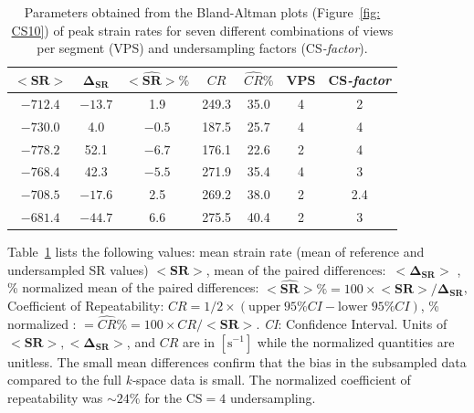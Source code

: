 \begin{table}[!htb]
\vspace{+0.2cm}
\caption[Parameters obtained from the Bland-Altman plots of peak strain rates for seven different combinations of views per segment and undersampling factors]{Parameters obtained from the Bland-Altman plots (Figure~\ref{fig: CS10}) of peak strain rates for seven different combinations of views per segment (VPS) and undersampling factors (\mbox{CS\textit{-factor}}).}
\label{tab: CS2}
\begin{center}
\begin{tabular}{@{}ccccccc@{}}
\toprule[1pt]\midrule[0.3pt]
$\mathbf{<SR>}$     & $\mathbf{\Delta_{SR}}$ & $\mathbf{<\hat{SR}> \%}$ & ${CR}$    & ${\hat{CR}} \%$ & VPS & \mbox{CS\textit{-factor}} \\ \midrule
$-712.4$ & $-13.7$    	& 1.9   	& 249.3 & 35.0   	& 4   & 2                  \\
$-730.0$ & 4.0        	& $-0.5$  	& 187.5 & 25.7  		& 4   & 4                  \\
$-778.2$ & 52.1     	& $-6.7$  	& 176.1 & 22.6  		& 2   & 4                  \\
$-768.4$ & 42.3     	& $-5.5$  	& 271.9 & 35.4  		& 4   & 3                  \\
$-708.5$ & $-17.6$    	& 2.5   	& 269.2 & 38.0    	& 2   & 2.4                \\
$-681.4$ & $-44.7$    	& 6.6   	& 275.5 & 40.4  		& 2   & 3         \\ \midrule[0.3pt]\bottomrule[1pt]
\end{tabular}
\end{center}
\vspace{-0.2cm}
\end{table}
Table~\ref{tab: CS2} lists the following values: mean strain rate (mean of reference and undersampled SR values) $\mathbf{<SR>}$, mean of the paired $\mathrm{differences}\colon$ $\mathbf{<\Delta_{{SR}}}>$ , \% normalized mean of the paired differences: $\mathbf{<\hat{SR}> \%} = 100 \times \mathbf{<SR>}/\mathbf{\Delta}_{\mathbf{SR}}$, Coefficient of Repeatability: $CR = 1/2 \times \left( \mathrm{upper \; 95\%} CI - \mathrm{lower \; 95\%} CI \right)$, \% normalized : $=\hat{CR} \% = 100 \times CR / \mathbf{<SR>}$. \textit{CI}: Confidence Interval. Units of $\mathbf{<SR>}, \mathbf{<\Delta_{{SR}}>}$, and ${CR}$ are in $\left[ \mathrm{s}^{-1} \right]$ while the normalized quantities are unitless.
The small mean differences confirm that the bias in the subsampled data compared to the full \mbox{\textit{k-}space} data is small. 
The normalized coefficient of repeatability was $\sim 24\%$ for the $\mathrm{CS}=4$ undersampling.
